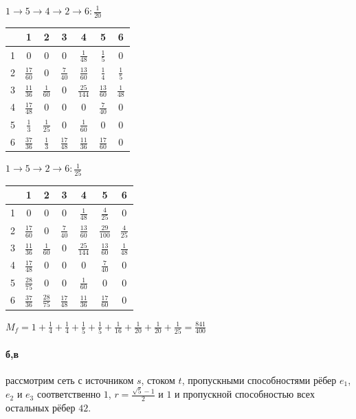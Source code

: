\documentclass[russian]{article}
\begin{document}
$ 1 \to 5 \to 4 \to 2 \to 6 : \frac{1}{20}$

\begin{tabular}{|c|c|c|c|c|c|c|}\hline
& 1& 2& 3& 4& 5& 6\\\hline
1& $0$& $0$& $0$& $\frac{1}{48}$& $\frac{1}{5}$& $0$\\\hline
2& $\frac{17}{60}$& $0$& $\frac{7}{40}$& $\frac{13}{60}$& $\frac{1}{4}$& $\frac{1}{5}$\\\hline
3& $\frac{11}{36}$& $\frac{1}{60}$& $0$& $\frac{25}{144}$& $\frac{13}{60}$& $\frac{1}{48}$\\\hline
4& $\frac{17}{48}$& $0$& $0$& $0$& $\frac{7}{40}$& $0$\\\hline
5& $\frac{1}{3}$& $\frac{1}{25}$& $0$& $\frac{1}{60}$& $0$& $0$\\\hline
6& $\frac{37}{36}$& $\frac{1}{3}$& $\frac{17}{48}$& $\frac{11}{36}$& $\frac{17}{60}$& $0$\\\hline
\end{tabular}

$ 1 \to 5 \to 2 \to 6 : \frac{1}{25}$

\begin{tabular}{|c|c|c|c|c|c|c|}\hline
& 1& 2& 3& 4& 5& 6\\\hline
1& $0$& $0$& $0$& $\frac{1}{48}$& $\frac{4}{25}$& $0$\\\hline
2& $\frac{17}{60}$& $0$& $\frac{7}{40}$& $\frac{13}{60}$& $\frac{29}{100}$& $\frac{4}{25}$\\\hline
3& $\frac{11}{36}$& $\frac{1}{60}$& $0$& $\frac{25}{144}$& $\frac{13}{60}$& $\frac{1}{48}$\\\hline
4& $\frac{17}{48}$& $0$& $0$& $0$& $\frac{7}{40}$& $0$\\\hline
5& $\frac{28}{75}$& $0$& $0$& $\frac{1}{60}$& $0$& $0$\\\hline
6& $\frac{37}{36}$& $\frac{28}{75}$& $\frac{17}{48}$& $\frac{11}{36}$& $\frac{17}{60}$& $0$\\\hline
\end{tabular}

$M_f=1+\frac{1}{4}+\frac{1}{4}+\frac{1}{5}+\frac{1}{5}+\frac{1}{16}+\frac{1}{20}+\frac{1}{20}+\frac{1}{25}=\frac{841}{400}$

\paragraph*{б,в}

рассмотрим сеть с источником $s$, стоком $t$, пропускными способностями рёбер $e_1$, $e_2$ и $e_3$ соответственно $1$, $r=\frac{\sqrt{5}-1}{2}$ и $1$ и пропускной способностью всех остальных рёбер $42$.
\end{document}
